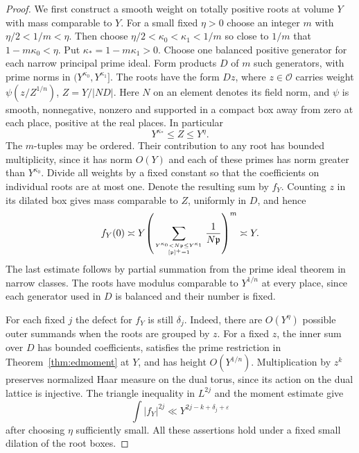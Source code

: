 \documentclass[11pt,letterpaper]{article}
\theoremstyle{definition}
\numberwithin{equation}{section}
\begin{document}
\begin{proof}
We first construct a smooth weight on totally positive roots at
volume $Y$ with mass comparable to $Y$. For a small fixed $\eta>0$
choose an integer $m$ with $\eta/2<1/m<\eta$. Then choose
$\eta/2<\kappa_0<\kappa_1<1/m$ so close to $1/m$ that
$1-m\kappa_0<\eta$. Put $\kappa_* = 1-m\kappa_1>0$.
Choose one balanced positive generator for each narrow principal
prime ideal. Form products $D$ of $m$ such generators, with prime
norms in $(Y^{\kappa_0},Y^{\kappa_1}]$. The roots have the form
$Dz$, where $z\in\mathcal O$ carries weight
$\psi(z/Z^{1/n})$, $Z=Y/|ND|$. Here $N$ on an element denotes
its field norm, and $\psi$ is smooth, nonnegative, nonzero and
supported in a compact box away from zero at each place, positive
at the real places. In particular
\[
             Y^{\kappa_*}\le Z\le Y^\eta .
\]
The $m$-tuples may be ordered. Their contribution to any root has
bounded multiplicity, since it has norm $O(Y)$ and each of these
primes has norm greater than $Y^{\kappa_0}$. Divide all weights
by a fixed constant so that the coefficients on individual roots
are at most one. Denote the resulting sum by $f_Y$. Counting $z$
in its dilated box gives mass comparable to $Z$, uniformly in $D$,
and hence
\[
  f_Y(0)\asymp Y\!
  \left(\sum_{Y^{\kappa_0}<N\mathfrak p\le Y^{\kappa_1}\atop
              [\mathfrak p]^+=1}\frac1{N\mathfrak p}\right)^m
  \asymp Y.
\]
The last estimate follows by partial summation from the prime ideal
theorem in narrow classes. The roots have modulus comparable to
$Y^{1/n}$ at every place, since each generator used in $D$ is
balanced and their number is fixed.

For each fixed $j$ the defect for $f_Y$ is still $\delta_j$. Indeed,
there are $O(Y^\eta)$ possible outer summands when the roots are
grouped by $z$. For a fixed $z$, the inner sum over $D$ has bounded
coefficients, satisfies the prime restriction in
Theorem~\ref{thm:edmoment} at $Y$, and has height $O(Y^{1/n})$.
Multiplication by $z^k$ preserves normalized Haar measure on the
dual torus, since its action on the dual lattice is injective.
The triangle inequality in $L^{2j}$ and the moment estimate give
\begin{equation}\label{eq:eddensemoment}
           \int |f_Y|^{2j}\ll Y^{2j-k+\delta_j+\varepsilon}
\end{equation}
after choosing $\eta$ sufficiently small. All these assertions hold
under a fixed small dilation of the root boxes.


\end{proof}
\end{document}
